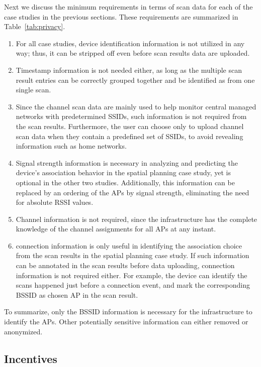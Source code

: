 Next we discuss the minimum requirements in terms of scan data for each of the
case studies in the previous sections. These requirements are summarized in
Table~\ref{tab:privacy}.

\begin{enumerate}
  \item For all case studies, device identification information is not
    utilized in any way; thus, it can be stripped off even before scan
    results data are uploaded.
  \item Timestamp information is not needed either, as long as the multiple
    scan result entries can be correctly grouped together and be identified as
    from one single scan.
  \item Since the channel scan data are mainly used to help monitor central
    managed networks with predetermined SSIDs, such information is not required
    from the scan results. Furthermore, the user can choose only to upload
    channel scan data when they contain a predefined set of SSIDs, to avoid
    revealing information such as home \wifi{} networks. 
  \item Signal strength information is necessary in analyzing and predicting
    the device's association behavior in the spatial planning case study, yet
    is optional in the other two studies. Additionally, this information can be
    replaced by an ordering of the APs by signal strength, eliminating the need
    for absolute RSSI values.
  \item Channel information is not required, since the infrastructure has the
    complete knowledge of the channel assignments for all APs at any instant.
  \item \wifi{} connection information is only useful in identifying the
    association choice from the scan results in the spatial planning case
    study. If such information can be annotated in the scan results before data
    uploading, \wifi{} connection information is not required either. For
    example, the device can identify the scans happened just before a \wifi{}
    connection event, and mark the corresponding BSSID as chosen AP in the scan
    result.
\end{enumerate}

To summarize, only the BSSID information is necessary for the infrastructure to
identify the APs. Other potentially sensitive information can either removed
or anonymized.

\subsection{Incentives}
\label{subsec:incentive}

